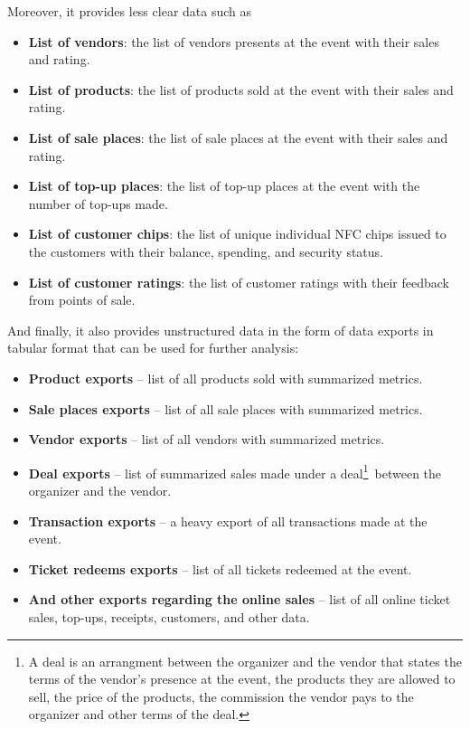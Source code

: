 Moreover, it provides less clear data such as
\begin{itemize}
	\item \textbf{List of vendors}: the list of vendors presents at the event with their sales and rating.
	\item \textbf{List of products}: the list of products sold at the event with their sales and rating.
	\item \textbf{List of sale places}: the list of sale places at the event with their sales and rating.
	\item \textbf{List of top-up places}: the list of top-up places at the event with the number of top-ups made.
	\item \textbf{List of customer chips}: the list of unique individual NFC chips issued to the customers with their balance, spending, and security status.
	\item \textbf{List of customer ratings}: the list of customer ratings with their feedback from points of sale.
\end{itemize}

And finally, it also provides unstructured data in the form of data exports in tabular format that can be used for further analysis:
\begin{itemize}
	\item \textbf{Product exports} – list of all products sold with summarized metrics.
	\item \textbf{Sale places exports} – list of all sale places with summarized metrics.
	\item \textbf{Vendor exports} – list of all vendors with summarized metrics.
	\item \textbf{Deal exports} – list of summarized sales made under a deal\footnote{
		A deal is an arrangment between the organizer and the vendor that states the terms of the vendor's presence at the event, the products they are allowed to sell, the price of the products, the commission the vendor pays to the organizer and other terms of the deal.
	}~between the organizer and the vendor.
	\item \textbf{Transaction exports} – a heavy export of all transactions made at the event.
	\item \textbf{Ticket redeems exports} – list of all tickets redeemed at the event.
	\item \textbf{And other exports regarding the online sales} – list of all online ticket sales, top-ups, receipts, customers, and other data.
\end{itemize}


